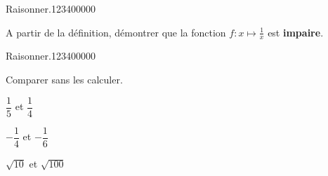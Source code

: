 \begin{pageAD}  %
\restoregeometry %


\begin{ExoCad}{Raisonner.}{1234}{0}{0}{0}{0}{0}

A partir de la définition, démontrer que la fonction $f:x\mapsto \frac{1}{x}$ est \textbf{impaire}.


%
%
%

\end{ExoCad} 

\begin{ExoCad}{Raisonner.}{1234}{0}{0}{0}{0}{0}

Comparer sans les calculer.
\begin{description}[leftmargin=*]
\item $\dfrac{1}{5}$ et $\dfrac{1}{4}$  



\item $-\dfrac{1}{4}$ et $-\dfrac{1}{6}$ 



\item $\sqrt{10}$ et $\sqrt{100}$ 




\end{description}


\end{ExoCad}
\end{pageAD}
